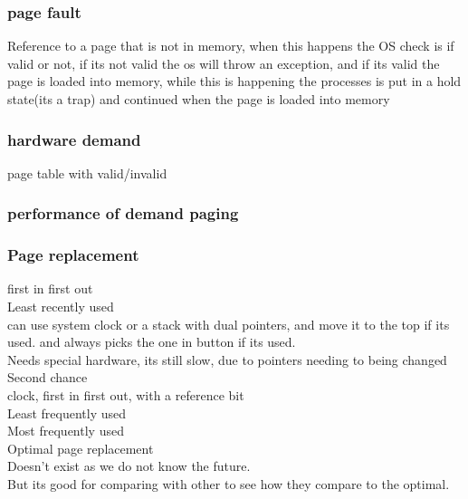 \documentclass[a4paper,10pt,titlepage]{report}
\begin{document}
\subsubsection{page fault}
Reference to a page that is not in memory, when this happens the OS check is if valid or not, if its not valid the os will throw an exception, and if its valid the page is loaded into memory, while this is happening the processes is put in a hold state(its a trap) and continued when the page is loaded into memory 
\subsubsection{hardware demand}
page table with valid/invalid\\

\subsubsection{performance of demand paging}

\subsubsection{Page replacement}
\hspace{10mm} first in first out\\
\hspace{10mm} Least recently used\\
\hspace{15mm} can use system clock or a stack with dual pointers, and move it to the top if its used. and always picks the one in button if its used.\\
\hspace{15mm} Needs special hardware, its still slow, due to pointers needing to being changed \\
\hspace{10mm} Second chance \\
\hspace{15mm} clock, first in first out, with a reference bit \\

\hspace{10mm} Least frequently used\\

\hspace{10mm} Most frequently used\\

\hspace{10mm} Optimal page replacement \\
\hspace{15mm}Doesn't exist as we do not know the future. \\
\hspace{15mm}But its good for comparing with other to see how they compare to the optimal.\\
\end{document}
